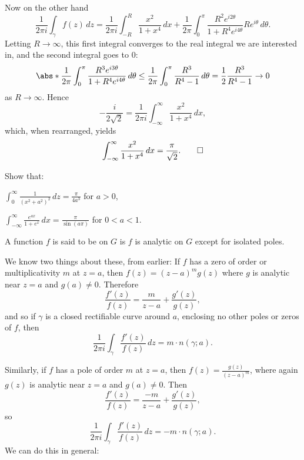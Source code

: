 \begin{example}
	Now on the other hand
	\[
		\frac{1}{2 \pi i} \int_\gamma f(z) \, d z = \frac{1}{2 \pi i} \int_{-R}^R \frac{x^2}{1 + x^4} \, d x + \frac{1}{2 \pi} \int_0^\pi \frac{R^2 e^{i 2 \theta}}{1 + R^4 e^{i 4 \theta}} R e^{i \theta} \, d \theta.
	\]
	Letting $R \to \infty$, this first integral converges to the real integral we are interested in, and the second integral goes to $0$:
	\[
		\abs*{\frac{1}{2 \pi} \int_0^\pi \frac{R^3 e^{i 3 \theta}}{1 + R^4 e^{i 4 \theta}} \, d \theta} \leq \frac{1}{2 \pi} \int_0^\pi \frac{R^3}{R^4 - 1} \, d \theta = \frac{1}{2} \frac{R^3}{R^4 - 1} \to 0
	\]
	as $R \to \infty$.
	Hence
	\[
		- \frac{i}{2 \sqrt{2}} = \frac{1}{2 \pi i} \int_{-\infty}^\infty \frac{x^2}{1 + x^4} \, d x,
	\]
	which, when rearranged, yields
	\[
		\int_{-\infty}^\infty \frac{x^2}{1 + x^4} \, d x = \frac{\pi}{\sqrt{2}}. \qedhere
	\]
\end{example}

\begin{exercise}
	Show that:
	\begin{parts}
		\item $\displaystyle \int_0^\infty \frac{1}{(x^2 + a^2)^2} \, d z = \frac{\pi}{4 a^3}$ for $a > 0$,
		\item $\displaystyle \int_{-\infty}^\infty \frac{e^{a x}}{1 + e^x} \, d x = \frac{\pi}{\sin(a \pi)}$ for $0 < a < 1$. \qedhere
	\end{parts}
\end{exercise}


\begin{definition}[Meromorphic]
	A function $f$ is said to be  on $G$ is $f$ is analytic on $G$ except for isolated poles.
\end{definition}

We know two things about these, from earlier:
If $f$ has a zero of order or multiplicativity $m$ at $z = a$, then $f(z) = (z - a)^m g(z)$ where $g$ is analytic near $z = a$ and $g(a) \neq 0$.
Therefore
\[
	\frac{f'(z)}{f(z)} = \frac{m}{z - a} + \frac{g'(z)}{g(z)},
\]
and so if $\gamma$ is a closed rectifiable curve around $a$, enclosing no other poles or zeros of $f$, then
\[
	\frac{1}{2 \pi i} \int_\gamma \frac{f'(z)}{f(z)} \, d z = m \cdot n(\gamma; a).
\]

Similarly, if $f$ has a pole of order $m$ at $z = a$, then $f(z) = \frac{g(z)}{(z - a)^m}$, where again $g(z)$ is analytic near $z = a$ and $g(a) \neq 0$.
Then
\[
	\frac{f'(z)}{f(z)} = \frac{- m}{z - a} + \frac{g'(z)}{g(z)},
\]
so
\[
	\frac{1}{2 \pi i} \int_\gamma \frac{f'(z)}{f(z)} \, d z = - m \cdot n(\gamma; a).
\]
We can do this in general:

